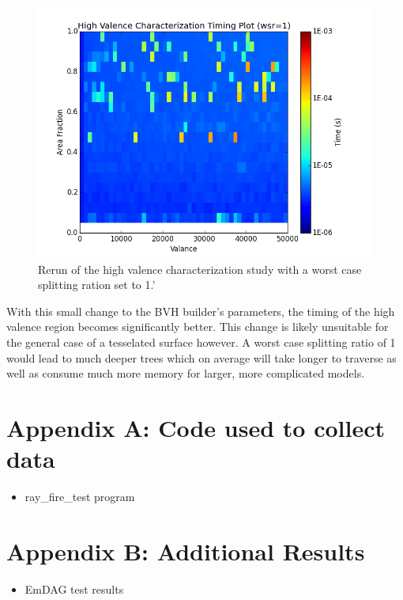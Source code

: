 \documentclass[10pt, a4paper]{article}
\begin{document}
  
\begin{figure}[H]
  \centering
    \includegraphics[scale=0.35]{hv_study_MOAB_wsr1.png}
    \caption{Rerun of the high valence characterization study with a worst case splitting ration set to 1.'}
\end{figure}


With this small change to the BVH builder's parameters, the timing of the high valence region becomes significantly better. This change is likely unsuitable for the general case of a tesselated surface however. A worst case splitting ratio of 1 would lead to much deeper trees which on average will take longer to traverse as well as consume much more memory for larger, more complicated models.






\section{Appendix A: Code used to collect data}
\begin{itemize}
\item ray\_fire\_test program
\end{itemize}

\section{Appendix B: Additional Results}
\begin{itemize}
\item EmDAG test results
\end{itemize}
\end{document}
